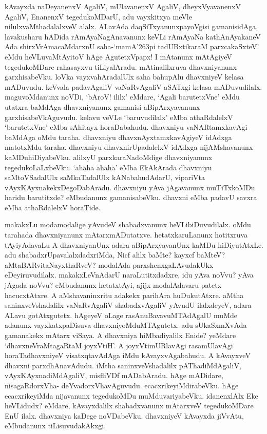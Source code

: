 \noindent
kAvayxda naDeyanenxV AgaliV, mUlavanenxV AgaliV, dheyxVyavanenxV AgaliV, EnanenxV tegedukoMDarU, adu vayxkitxya meVle nilulxvaMthadalalxveV alalx. ALavAda daqSiTxyanunxpayoVgisi gamanisidAga, lavakusharu hADida rAmAyaNagAnavanunx keVLi rAmAyaNa kathAnAyakaneV Ada shirxVrAmacaMdarxnU saha-`mamA\char'263pi tadUBxtikaraM\label{236} parxcakaSxteV' eMdu heVLuvaMtAyitoV hAge AgutetxVpapx! I mAtanunx mAtAgiyeV tegedukoMDare rahasayxvu tiLiyalAradu. mAtinalilxruva dhavxniyanunx garxhisabeVku. loVka vayxvahAradalUlx saha bahupAlu dhavxniyeV kelasa mADuvudu. keVvala padavAgaliV vaNaRvAgaliV aSATxgi kelasa mADuvudilalx. maguvoMdanunx noVDi, `bAroV! ililx' eMdare, `Agali barutetxVne' eMdu utatxra baMdAga dhavxniyanunx gamanisi aBipArxyavanunx garxhisabeVkAguvudu. kelavu veVLe `baruvudilalx' eMba athaRdalelxV `barutetxVne' eMba sAhitayx horaDabahudu. dhavxniyu vaNARtamxkavAgi baMdAga oMdu taraha. dhavxniyu dhavxnAyxtamxkavAgiyeV idAdxga matotxMdu taraha. dhavxniyu dhavxnirUpadalelxV idAdxga nijAMshavanunx kaMDuhiDiyabeVku. alilxyU parxkaraNadoMdige dhavxniyanunx tegedukoLaLxbeVku. `ahaha ahaha' eMba EkAkArada dhavxniyu saMtoVSadalUlx saMkaTadalUlx kANabahudAdarU, vipariVta vAyxKAyxnakekxDegoDabAradu. dhavxniyu yAva jAgavanunx muTiTxkoMDu haridu barutitxde? eMbudanunx gamanisabeVku. dhavxni eMba padavU savxra eMba athaRdalelxV horaTide.

\medskip

makakxLu modamodalige yAvudeV shabadxvanunx heVLibiDuvudilalx. oMdu tarahada dhavxniyanunx mAtarxmADutatxve. hetatxkaruLanunx hotitxruva tAyiyAdavaLu A dhavxniyanUnx adara aBipArxyavanUnx kaMDu hiDiyutAtxLe. adu shabadxrUpavalalxdadxriMda, Nicf alilx baMte? kayxcf baMteV? aMtaBARvitaNayxthaRveV? modalAda parxshenxgaLAvudakUkx eDeyiruvudilalx. makakxLeVnAdarU naraLutitxdadxre, idu yAva noVvu? yAva jAgada noVvu? eMbudanunx hetatxtAyi, ajijx modalAdavaru patetx hacucxtAtxre. A aMshavaninxritu adakekx parihAra huDukutAtxre. aMtha saninxveVshadalilx vaNaRvAgaliV shabadxvAgaliV yAvudU ilalxdeyeV, adara ALavu gotAtxgutetx. hAgeyeV oLage rasAnuBavavuMTAdAgalU muMde adanunx vayxkatxpaDisuva dhavxniyoMduMTAgutetx. adu sUkaSxmXvAda gamanakekx mAtarx viSaya. A dhavxniya hiMbadiyalilx Enide? yeMdare `dhavxneVraMtagaRtaM joyxVtiH'\label{152h}. A joyxVtimURlavAgi rasamUlavAgi horaTadhavxniyeV visatxqtavAdAga iMdu kAvayxvAgabahudu. A kAvayxveV dhavxni parxdhAnavAdudu. iMtha saninxveVshadalilx pAThadiMdAgaliV, vAyxKAyxnadiMdAgaliV, misfliVDf mADabAradu. hAge mADidare, nisagaRdorxVha- deYvadorxVhavAguvudu. ecacxrikeyiMdirabeVku. hAge ecacxrikeyiMda nijavanunx tegedukoMDu muMduvariyabeVku. idanenxlAlx Eke heVLidudx? eMdare, kAvayxdalilx shabadxvanunx mAtarxveV tegedukoMDare EnU ilalx. dhavxniya kaDege noVDabeVku. dhavxniyeV kAvayxda jiVvAtu, eMbudanunx tiLisuvudakAkxgi.

